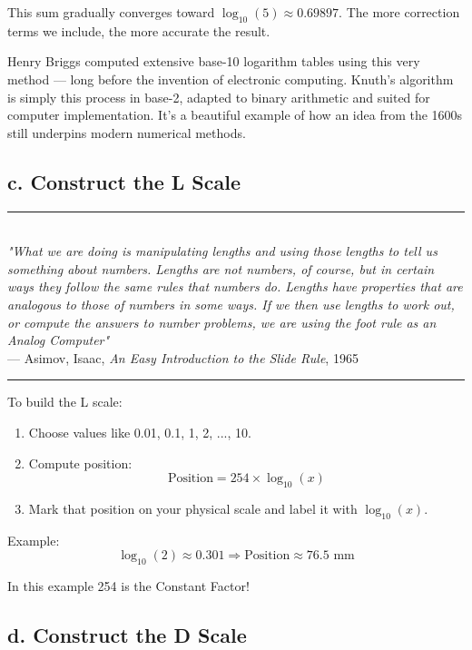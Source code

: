 \documentclass[10pt,twocolumn]{article}
\begin{document}
This sum gradually converges toward \( \log_{10}(5) \approx 0.69897 \). The more correction terms we include, the more accurate the result.

Henry Briggs computed extensive base-10 logarithm tables using this very method — long before the invention of electronic computing. Knuth’s algorithm is simply this process in base-2, adapted to binary arithmetic and suited for computer implementation. It’s a beautiful example of how an idea from the 1600s still underpins modern numerical methods.

\subsection*{c. Construct the L Scale}

\begin{center}
\noindent\rule{0.8\textwidth}{0.4pt} \\[0.4em]
\textit{"What we are doing is manipulating lengths and using those lengths to tell us something about numbers. Lengths are not numbers, of course, but in certain ways they follow the same rules that numbers do. Lengths have properties that are analogous to those of numbers in some ways. If we then use lengths to work out, or compute the answers to number problems, we are using the foot rule as an Analog Computer"} \\
\hfill --- Asimov, Isaac, \textit{An Easy Introduction to the Slide Rule}, 1965 \\[0.4em]
\rule{0.8\textwidth}{0.4pt}
\end{center}

To build the L scale:

\begin{enumerate}
  \item Choose values like 0.01, 0.1, 1, 2, ..., 10.
  \item Compute position: \[ \text{Position} = 254 \times \log_{10}(x) \]
  \item Mark that position on your physical scale and label it with $\log_{10}(x)$.
\end{enumerate}

Example:
\[
\log_{10}(2) \approx 0.301 \Rightarrow \text{Position} \approx 76.5 \text{ mm}
\]

In this example 254 is the Constant Factor!

\subsection*{d. Construct the D Scale}
\end{document}
